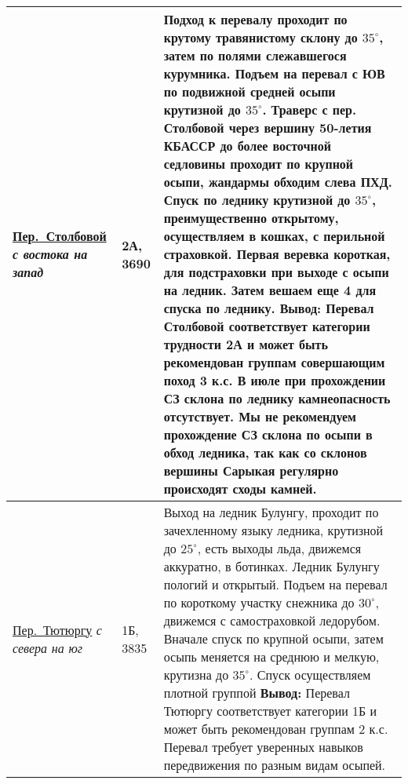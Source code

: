 {\begin{longtable}{|>{\centering\arraybackslash}m{3.8cm}|>{\centering\arraybackslash}m{1.3cm}|>{\raggedright\arraybackslash}m{12.5cm}|}
		 	\hyperref[subsec:Day11]{Пер.~Столбовой}																	\newline\textit{с востока на запад}		&	2А, 3690					&	Подход к перевалу проходит по крутому травянистому склону  до $35^\circ$, затем по полями слежавшегося курумника. Подъем на перевал с ЮВ по подвижной средней осыпи крутизной до $35^\circ$. Траверс с пер. Столбовой через вершину 50-летия КБАССР до более восточной седловины проходит по крупной осыпи, жандармы обходим слева ПХД. Спуск по леднику крутизной до $35^\circ$, преимущественно открытому, осуществляем в кошках, с перильной страховкой. Первая веревка короткая, для подстраховки при выходе с осыпи на ледник. Затем вешаем еще 4 для спуска по леднику. \newline \textbf{Вывод:} Перевал Столбовой соответствует категории трудности 2А и может быть рекомендован группам совершающим поход 3 к.с. В июле при прохождении СЗ склона по леднику камнеопасность отсутствует. Мы не рекомендуем прохождение СЗ склона по осыпи в обход ледника, так как со склонов вершины Сарыкая регулярно происходят сходы камней.																																																																																																																																																																																																																																																																															\\ \hline
			\hyperref[subsec:Day12]{Пер.~Тютюргу}																	\newline\textit{с севера на юг}			&	1Б, 3835					&	Выход на ледник Булунгу, проходит по зачехленному языку ледника, крутизной до $25^\circ$, есть выходы льда, движемся аккуратно, в ботинках. Ледник Булунгу пологий и открытый. Подъем на перевал по короткому участку снежника до $30^\circ$, движемся с самостраховкой ледорубом. Вначале спуск по крупной осыпи, затем осыпь меняется на среднюю и мелкую, крутизна до $35^\circ$. Спуск осуществляем плотной группой \newline \textbf{Вывод:} Перевал Тютюргу соответствует категории 1Б и может быть рекомендован группам 2 к.с. Перевал требует уверенных навыков передвижения по разным видам осыпей.																																																																																																																																																																																																																																																																																																																																																															\\ \hline

\end{longtable}}
